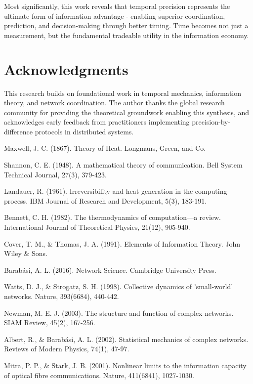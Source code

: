 \documentclass[12pt,a4paper]{article}
\begin{document}
Most significantly, this work reveals that temporal precision represents the ultimate form of information advantage - enabling superior coordination, prediction, and decision-making through better timing. Time becomes not just a measurement, but the fundamental tradeable utility in the information economy.

\section*{Acknowledgments}

This research builds on foundational work in temporal mechanics, information theory, and network coordination. The author thanks the global research community for providing the theoretical groundwork enabling this synthesis, and acknowledges early feedback from practitioners implementing precision-by-difference protocols in distributed systems.


\begin{thebibliography}{99}

Maxwell, J. C. (1867). Theory of Heat. Longmans, Green, and Co.

Shannon, C. E. (1948). A mathematical theory of communication. Bell System Technical Journal, 27(3), 379-423.

Landauer, R. (1961). Irreversibility and heat generation in the computing process. IBM Journal of Research and Development, 5(3), 183-191.

Bennett, C. H. (1982). The thermodynamics of computation—a review. International Journal of Theoretical Physics, 21(12), 905-940.

Cover, T. M., \& Thomas, J. A. (1991). Elements of Information Theory. John Wiley \& Sons.

Barabási, A. L. (2016). Network Science. Cambridge University Press.

Watts, D. J., \& Strogatz, S. H. (1998). Collective dynamics of 'small-world' networks. Nature, 393(6684), 440-442.

Newman, M. E. J. (2003). The structure and function of complex networks. SIAM Review, 45(2), 167-256.

Albert, R., \& Barabási, A. L. (2002). Statistical mechanics of complex networks. Reviews of Modern Physics, 74(1), 47-97.

Mitra, P. P., \& Stark, J. B. (2001). Nonlinear limits to the information capacity of optical fibre communications. Nature, 411(6841), 1027-1030.

\end{thebibliography}
\end{document}
